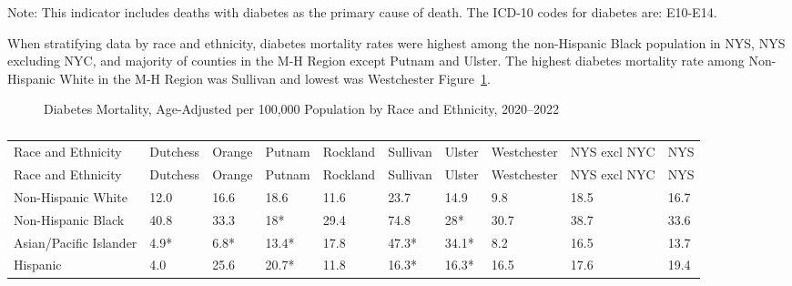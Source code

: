 \documentclass[
  english,
  letterpaper,
]{report}
\begin{document}
\begin{tcolorbox}[enhanced jigsaw, breakable, leftrule=.75mm, title=\textcolor{quarto-callout-note-color}{\faInfo}\hspace{0.5em}{Note}, bottomrule=.15mm, opacityback=0, left=2mm, colback=white, bottomtitle=1mm, coltitle=black, colbacktitle=quarto-callout-note-color!10!white, colframe=quarto-callout-note-color-frame, opacitybacktitle=0.6, toptitle=1mm, titlerule=0mm, arc=.35mm, rightrule=.15mm, toprule=.15mm]

Note: This indicator includes deaths with diabetes as the primary cause
of death. The ICD-10 codes for diabetes are: E10-E14.

\end{tcolorbox}

When stratifying data by race and ethnicity, diabetes mortality rates
were highest among the non-Hispanic Black population in NYS, NYS
excluding NYC, and majority of counties in the M-H Region except Putnam
and Ulster. The highest diabetes mortality rate among Non-Hispanic White
in the M-H Region was Sullivan and lowest was Westchester
Figure~\ref{fig-dm-mortal-rande-aar}.

\begin{figure}


\caption{\label{fig-dm-mortal-rande-aar}Diabetes Mortality, Age-Adjusted
per 100,000 Population by Race and Ethnicity, 2020--2022}

\end{figure}%

\begin{longtable}[]{@{}llllllllll@{}}

\caption{\label{tbl-dm-mortal-rande-aar}Diabetes Mortality, Age-Adjusted
per 100,000 Population by Race and Ethnicity, 2020--2022}

\tabularnewline

\caption{}\label{T_22554}\tabularnewline
\toprule\noalign{}
Race and Ethnicity & Dutchess & Orange & Putnam & Rockland & Sullivan &
Ulster & Westchester & NYS excl NYC & NYS \\
\midrule\noalign{}
\endfirsthead
\toprule\noalign{}
Race and Ethnicity & Dutchess & Orange & Putnam & Rockland & Sullivan &
Ulster & Westchester & NYS excl NYC & NYS \\
\midrule\noalign{}
\endhead
\bottomrule\noalign{}
\endlastfoot
Non-Hispanic White & 12.0 & 16.6 & 18.6 & 11.6 & 23.7 & 14.9 & 9.8 &
18.5 & 16.7 \\
Non-Hispanic Black & 40.8 & 33.3 & 18* & 29.4 & 74.8 & 28* & 30.7 & 38.7
& 33.6 \\
Asian/Pacific Islander & 4.9* & 6.8* & 13.4* & 17.8 & 47.3* & 34.1* &
8.2 & 16.5 & 13.7 \\
Hispanic & 4.0 & 25.6 & 20.7* & 11.8 & 16.3* & 16.3* & 16.5 & 17.6 &
19.4 \\

\end{longtable}
\end{document}
